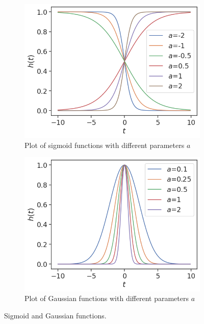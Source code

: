 \documentclass[12pt, oneside]{report}   	%
\begin{document}
\begin{figure}[t]
     \centering
     \begin{subfigure}[b]{0.45\textwidth}
         \centering
         \includegraphics[width=\textwidth]{newsig.png}
         \caption{Plot of sigmoid functions with different parameters $a$}
         \label{fig:sig}
     \end{subfigure}
     \hfill
     \begin{subfigure}[b]{0.45\textwidth}
         \centering
         \includegraphics[width=\textwidth]{newgaus.png}
         \caption{Plot of Gaussian functions with different parameters $a$}
         \label{fig:gaus}
     \end{subfigure}
        \caption{Sigmoid and Gaussian functions.}
        \label{fig:sigandgaus}
\end{figure}
\end{document}
